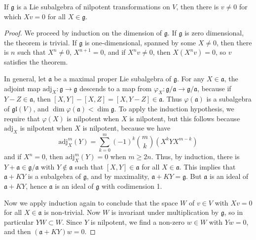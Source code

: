 \begin{lemma}
    If $\mathfrak{g}$ is a Lie subalgebra of nilpotent transformations on $V$, then there is $v \neq 0$ for which $Xv = 0$ for all $X \in \mathfrak{g}$.
\end{lemma}
\begin{proof}
    We proceed by induction on the dimension of $\mathfrak{g}$. If $\mathfrak{g}$ is zero dimensional, the theorem is trivial. If $\mathfrak{g}$ is one-dimensional, spanned by some $X \neq 0$, then there is $n$ such that $X^n \neq 0$, $X^{n+1} = 0$, and if $X^n v \neq 0$, then $X(X^n v) = 0$, so $v$ satisfies the theorem.

    In general, let $\mathfrak{a}$ be a maximal proper Lie subalgebra of $\mathfrak{g}$. For any $X \in \mathfrak{a}$, the adjoint map $\text{adj}_X: \mathfrak{g} \to \mathfrak{g}$ descends to a map from $\varphi_X: \mathfrak{g}/\mathfrak{a} \to \mathfrak{g}/\mathfrak{a}$, because if $Y - Z \in \mathfrak{a}$, then $[X,Y] - [X,Z] = [X,Y-Z] \in \mathfrak{a}$. Thus $\varphi(\mathfrak{a})$ is a subalgebra of $\mathfrak{gl}(V)$, and $\dim \varphi(\mathfrak{a}) < \dim \mathfrak{g}$. To apply the induction hypothesis, we require that $\varphi(X)$ is nilpotent when $X$ is nilpotent, but this follows because $\text{adj}_X$ is nilpotent when $X$ is nilpotent, because we have
    \[ \text{adj}^m_X(Y) = \sum_{k = 0}^m (-1)^k {m \choose k} (X^kYX^{m-k}) \]
    and if $X^n = 0$, then $\text{adj}^m_X(Y) = 0$ when $m \geq 2n$. Thus, by induction, there is $Y + \mathfrak{a} \in \mathfrak{g}/\mathfrak{a}$ with $Y \not \in \mathfrak{a}$ such that $[X,Y] \in \mathfrak{a}$ for all $X \in \mathfrak{a}$. This implies that $\mathfrak{a} + K Y$ is a subalgebra of $\mathfrak{g}$, and by maximality, $\mathfrak{a} + K Y = \mathfrak{g}$. But $\mathfrak{a}$ is an ideal of $\mathfrak{a} + K Y$, hence $\mathfrak{a}$ is an ideal of $\mathfrak{g}$ with codimension 1.

    Now we apply induction again to conclude that the space $W$ of $v \in V$ with $Xv = 0$ for all $X \in \mathfrak{a}$ is non-trivial. Now $W$ is invariant under multiplication by $\mathfrak{g}$, so in particular $YW \subset W$. Since $Y$ is nilpotent, we find a non-zero $w \in W$ with $Yw = 0$, and then $(\mathfrak{a} + KY)w = 0$.
\end{proof}

